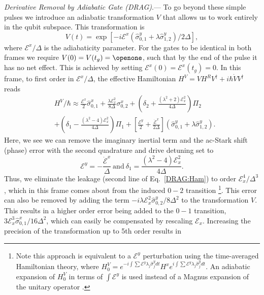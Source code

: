 \documentclass[prl,twocolumn,aps,final,floatfix,superscriptaddress,showpacs]{revtex4}
\newcommand{\dg}{^\dagger}
\newcommand{\eqrf}[1]{Eq.~\eqref{#1}}
\newcommand{\sxo}{\hat{\sigma}^x}
\newcommand{\syo}{\hat{\sigma}^y}
\renewcommand{\section}[1]{{\em #1}.---}
\begin{document}
\section{Derivative Removal by Adiabatic Gate (DRAG)} To go beyond these simple pulses we  introduce an adiabatic transformation $V$ that allows us to work entirely in the qubit subspace. This transformation is 
\begin{equation}
V(t)=\exp\left[-i\mathcal{E}^x\left(\syo_{0,1}+\lambda\syo_{1,2} \right)/2\Delta\right],
\end{equation} where ${\mathcal{E}^x}/{\Delta}$ is the adiabaticity parameter.
 For the gates to be identical in both frames we require $V(0)=V(t_g)=\openone$, such that by the end of the pulse it has no net effect. This is achieved by setting $\mathcal{E}^x(0)=\mathcal{E}^x(t_g)=0$. In this frame, to first order in ${\mathcal{E}^x}/{\Delta}$, the effective Hamiltonian $H^V=VH^RV\dg+i\hbar\dot VV\dg$ reads
\begin{equation}
\begin{split}\label{DRAG:Ham}
		&H^V/\hbar \approx \frac{\mathcal{E}^x}{2}\sxo_{0,1} +\frac{\lambda\mathcal{E}_x^2}{8\Delta}\sigma_{0,2}^x + (\delta_2 + \frac{(\lambda^2+2)\mathcal{E}_x^2}{4\Delta})\Pi_2 \\
		&+ (\delta_1 - \frac{(\lambda^2-4)\mathcal{E}_x^2}{4\Delta})\Pi_1 + \left[\frac{\mathcal{E}^y}{2}+\frac{\mathcal{\dot E}^x}{2\Delta}\right](\syo_{0,1} + \lambda\syo_{1,2}).
\end{split}
\end{equation}
Here, we see we can remove the imaginary inertial term and the ac-Stark shift (phase) error with the second quadrature and drive detuning set to
\begin{equation}
		\mathcal{E}^y=-\frac{\mathcal{\dot E}^x}{\Delta} ~\mathrm{and}~\delta_1 =\frac{(\lambda^2-4)\mathcal{E}_x^2}{4\Delta}.
\end{equation} 
Thus, we  eliminate the leakage (second line of \eqrf{DRAG:Ham}) to order ${\mathcal{E}_x^4}/{\Delta^3}$, which in this frame comes about from the induced $0-2$ transition  \footnote{Note this approach is equivalent to a $\mathcal{E}^y$ perturbation using the time-averaged Hamiltonian theory, where $H^V_0=e^{-i\int \sum{\mathcal{E}^y\lambda_j\syo_j}dt}H^xe^{i\int \sum{\mathcal{E}^y\lambda_j\syo_j}dt}$. An adiabatic expansion of $H^V_0$ in terms of $\int\mathcal{E}^y$ is used instead of a Magnus expansion of the unitary operator \cite{Warren:1984a}.}. 
This error can also be removed by adding the term 
 $-i{\lambda\mathcal{E}_x^2}\syo_{0,2}/{8\Delta^2}$ to the transformation $V$. This results in a higher order error being added to the $0-1$ transition, ${3\mathcal{E}_x^3}\sxo_{0,1}/{16\Delta^2}$, which can easily be compensated by rescaling $\mathcal{E}_x$.  Increasing the precision of the transformation up to 5th order results in
\end{document}
